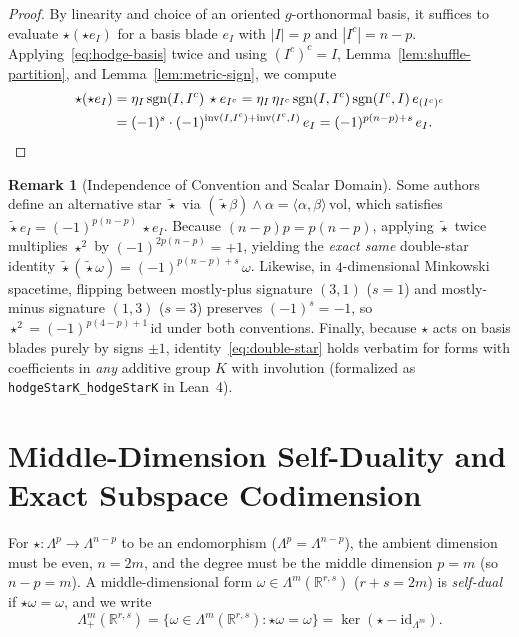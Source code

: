 \documentclass[11pt]{article}
\theoremstyle{definition}
\newtheorem{remark}[theorem]{Remark}
\newcommand{\R}{\mathbb{R}}
\newcommand{\vol}{\mathrm{vol}}
\newcommand{\inv}{\mathrm{inv}}
\newcommand{\sgn}{\mathrm{sgn}}
\newcommand{\id}{\mathrm{id}}
\begin{document}
\begin{proof}
By linearity and choice of an oriented $g$-orthonormal basis, it suffices to evaluate $\star(\star e_I)$ for a basis blade $e_I$ with $|I| = p$ and $|I^c| = n - p$. Applying~\eqref{eq:hodge-basis} twice and using $(I^c)^c = I$, Lemma~\ref{lem:shuffle-partition}, and Lemma~\ref{lem:metric-sign}, we compute
\begin{align*}
  \star(\star e_I)
  &= \eta_I\,\sgn(I, I^c)\,\star e_{I^c}
   = \eta_I\,\eta_{I^c}\,\sgn(I, I^c)\,\sgn(I^c, I)\,e_{(I^c)^c} \\
  &= (-1)^s \cdot (-1)^{\inv(I, I^c) + \inv(I^c, I)}\,e_I
   = (-1)^{p(n-p)+s}\,e_I. \qedhere
\end{align*}
\end{proof}

\begin{remark}[Independence of Convention and Scalar Domain]\label{rem:conventions}
Some authors define an alternative star $\tilde{\star}$ via $(\tilde{\star}\beta) \wedge \alpha = \langle \alpha, \beta \rangle\,\vol$, which satisfies $\tilde{\star} e_I = (-1)^{p(n-p)}\,\star e_I$. Because $(n-p)p = p(n-p)$, applying $\tilde{\star}$ twice multiplies $\star^2$ by $(-1)^{2p(n-p)} = +1$, yielding the \emph{exact same} double-star identity $\tilde{\star}(\tilde{\star}\omega) = (-1)^{p(n-p)+s}\,\omega$. Likewise, in $4$-dimensional Minkowski spacetime, flipping between mostly-plus signature $(3,1)$ ($s=1$) and mostly-minus signature $(1,3)$ ($s=3$) preserves $(-1)^s = -1$, so $\star^2 = (-1)^{p(4-p)+1}\,\id$ under both conventions. Finally, because $\star$ acts on basis blades purely by signs $\pm 1$, identity~\eqref{eq:double-star} holds verbatim for forms with coefficients in \emph{any} additive group $K$ with involution (formalized as \texttt{hodgeStarK\_hodgeStarK} in Lean~4).
\end{remark}

\section{Middle-Dimension Self-Duality and Exact Subspace Codimension}

For $\star : \Lambda^p \to \Lambda^{n-p}$ to be an endomorphism ($\Lambda^p = \Lambda^{n-p}$), the ambient dimension must be even, $n = 2m$, and the degree must be the middle dimension $p = m$ (so $n - p = m$). A middle-dimensional form $\omega \in \Lambda^m(\R^{r,s})$ ($r + s = 2m$) is \emph{self-dual} if $\star\omega = \omega$, and we write
\[
  \Lambda^m_+(\R^{r,s}) = \bigl\{\omega \in \Lambda^m(\R^{r,s}) : \star\omega = \omega\bigr\} = \ker(\star - \id_{\Lambda^m}).
\]
\end{document}
